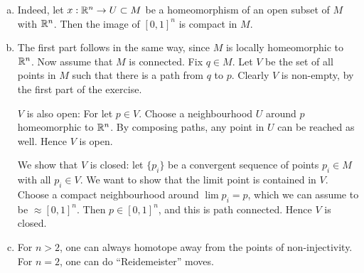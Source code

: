 \documentclass[11pt, english]{article}
\begin{document}
\begin{sol}
  \begin{enumerate}[a)]
  \item Indeed, let $x:\mathbb{R}^n \to U \subset M$ be a homeomorphism of an open subset of $M$ with $\mathbb{R}^n$. Then the image of $[0,1]^n$ is compact in $M$. 
\item The first part follows in the same way, since $M$ is locally homeomorphic to $\mathbb{R}^n$. Now assume that $M$ is connected. Fix $q \in M$. Let $V$ be the set of all points in $M$ such that there is a path from $q$ to $p$. Clearly $V$ is non-empty, by the first part of the exercise.

$V$ is also open: For let $p \in V$. Choose a neighbourhood $U$ around $p$ homeomorphic to $\mathbb{R}^n$. By composing paths, any point in $U$ can be reached as well. Hence $V$ is open.

We show that $V$ is closed: let $\{p_i \}$ be a convergent sequence of points $p_i \in M$ with all $p_i \in V$. We want to show that the limit point is contained in $V$. Choose a compact neighbourhood around $\lim p_i = p$, which we can assume to be $\approx [0,1]^n$. Then $p \in [0,1]^n$, and this is path connected. Hence $V$ is closed.
\item For $n > 2$, one can always homotope away from the points of non-injectivity. For $n=2$, one can do ``Reidemeister'' moves.
  \end{enumerate}
\end{sol}
\end{document}

